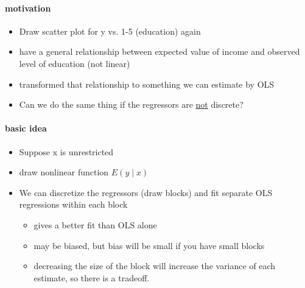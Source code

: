 \paragraph{motivation}
\begin{itemize}
\item Draw scatter plot for y vs. 1-5 (education) again
\item have a general relationship between expected value of income
         and observed level of education (not linear)
\item transformed that relationship to something we can estimate by
         OLS
\item Can we do the same thing if the regressors are \underline{not}
         discrete?
\end{itemize}

\paragraph{basic idea}
\begin{itemize}
\item Suppose x is unrestricted
\item draw nonlinear function $E(y \mid x)$
\item We can discretize the regressors (draw blocks) and fit
         separate OLS regressions within each block
\begin{itemize}
\item gives a better fit than OLS alone
\item may be biased, but bias will be small if you have small
           blocks
\item decreasing the size of the block will increase the variance
           of each estimate, so there is a tradeoff.
\end{itemize}
\end{itemize}

